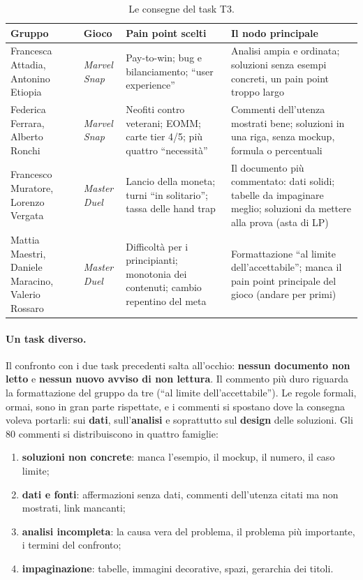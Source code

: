 \begin{table}[htbp]
  \centering
  \caption{Le consegne del task T3.}
  \label{rv:t3:tab:consegne}
  \small
  \begin{tabular}{@{}p{2.4cm}p{1.7cm}p{3.6cm}p{4.1cm}@{}}
    \toprule
    \textbf{Gruppo} & \textbf{Gioco} & \textbf{Pain point scelti} &
    \textbf{Il nodo principale} \\
    \midrule
    Francesca Attadia, Antonino Etiopia & \emph{Marvel Snap} &
      Pay-to-win; bug e bilanciamento; ``user experience'' &
      Analisi ampia e ordinata; soluzioni senza esempi concreti, un pain
      point troppo largo \\
    \addlinespace
    Federica Ferrara, Alberto Ronchi & \emph{Marvel Snap} &
      Neofiti contro veterani; EOMM; carte tier 4/5; più quattro
      ``necessità'' &
      Commenti dell'utenza mostrati bene; soluzioni in una riga, senza
      mockup, formula o percentuali \\
    \addlinespace
    Francesco Muratore, Lorenzo Vergata & \emph{Master Duel} &
      Lancio della moneta; turni ``in solitario''; tassa delle hand trap &
      Il documento più commentato: dati solidi; tabelle da impaginare
      meglio; soluzioni da mettere alla prova (asta di LP) \\
    \addlinespace
    Mattia Maestri, Daniele Maracino, Valerio Rossaro & \emph{Master
      Duel} &
      Difficoltà per i principianti; monotonia dei contenuti; cambio
      repentino del meta &
      Formattazione ``al limite dell'accettabile''; manca il pain point
      principale del gioco (andare per primi) \\
    \bottomrule
  \end{tabular}
\end{table}

\paragraph{Un task diverso.} Il confronto con i due task precedenti salta
all'occhio: \textbf{nessun documento non letto} e \textbf{nessun nuovo
avviso di non lettura}. Il commento più duro riguarda la formattazione del
gruppo da tre (``al limite dell'accettabile''). Le regole formali, ormai,
sono in gran parte rispettate, e i commenti si spostano dove la consegna
voleva portarli: sui \textbf{dati}, sull'\textbf{analisi} e soprattutto sul
\textbf{design} delle soluzioni. Gli 80 commenti si distribuiscono in quattro
famiglie:
\begin{enumerate}
  \item \textbf{soluzioni non concrete}: manca l'esempio, il mockup, il
        numero, il caso limite;
  \item \textbf{dati e fonti}: affermazioni senza dati, commenti dell'utenza
        citati ma non mostrati, link mancanti;
  \item \textbf{analisi incompleta}: la causa vera del problema, il problema
        più importante, i termini del confronto;
  \item \textbf{impaginazione}: tabelle, immagini decorative, spazi,
        gerarchia dei titoli.
\end{enumerate}

